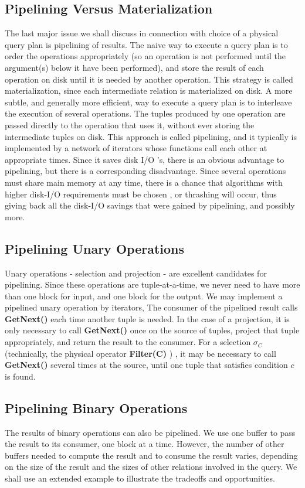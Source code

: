 \subsection{Pipelining Versus Materialization}
The last major issue we shall discuss in connection with choice of a physical query plan is pipelining of results. The naive way to execute a query plan is to order the operations appropriately (so an operation is not performed until the argument(s) below it have been performed), and store the result of each operation on disk until it is needed by another operation. This strategy is called materialization, since each intermediate relation is materialized on disk. A more subtle, and generally more efficient, way to execute a query plan is to interleave the execution of several operations. The tuples produced by one operation are passed directly to the operation that uses it, without ever storing the intermediate tuples on disk. This approach is called pipelining, and it typically is implemented by a network of iterators whose functions call each other at appropriate times. Since it saves disk I/O 's, there is an obvious advantage to pipelining, but there is a corresponding disadvan­tage. Since several operations must share main memory at any time, there is a chance that algorithms with higher disk-I/O requirements must be chosen , or thrashing will occur, thus giving back all the disk-I/O savings that were gained by pipelining, and possibly more.


\subsection{Pipelining Unary Operations}
Unary operations - selection and projection - are excellent candidates for pipelining. Since these operations are tuple-at-a-time, we never need to have more than one block for input, and one block for the output. We may implement a pipelined unary operation by iterators, The consumer of the pipelined result calls \textbf{GetNext()} each time another tuple is needed. In the case of a projection, it is only necessary to call \textbf{GetNext()} once on the source of tuples, project that tuple appropriately, and return the result to the consumer. For a selection $\sigma_C$ (technically, the physical operator \textbf{Filter(C)} ) , it may be necessary to call \textbf{GetNext()} several times at the source, until one tuple that satisfies condition $c$ is found.


\subsection{Pipelining Binary Operations}
The results of binary operations can also be pipelined. We use one buffer to pass the result to its consumer, one block at a time. However, the number of other buffers needed to compute the result and to consume the result varies, depending on the size of the result and the sizes of other relations involved in the query. We shall use an extended example to illustrate the tradeoffs and opportunities.


